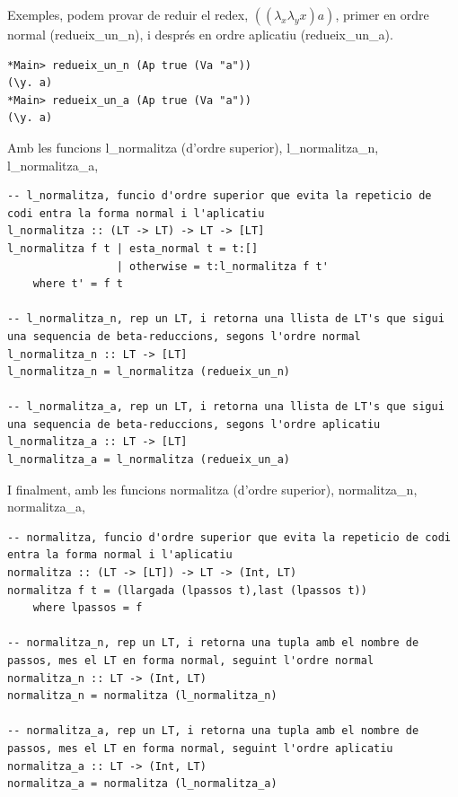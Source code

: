 \documentclass[10pt,a4paper]{article}
\begin{document}
Exemples, podem provar de reduir el redex, $((\lambda_x \lambda_y x) a)$, primer en ordre normal (redueix\_un\_n), i després en ordre aplicatiu (redueix\_un\_a).

\lstset{language=Haskell, breaklines=true, basicstyle=\footnotesize}
\begin{lstlisting}[frame=mystyle]
*Main> redueix_un_n (Ap true (Va "a"))
(\y. a)
*Main> redueix_un_a (Ap true (Va "a"))
(\y. a)
\end{lstlisting}

\clearpage

Amb les funcions l\_normalitza (d'ordre superior), l\_normalitza\_n, l\_normalitza\_a, 

\lstset{language=Haskell, breaklines=true, basicstyle=\footnotesize}
\begin{lstlisting}[frame=mystyle]
-- l_normalitza, funcio d'ordre superior que evita la repeticio de codi entra la forma normal i l'aplicatiu
l_normalitza :: (LT -> LT) -> LT -> [LT]
l_normalitza f t | esta_normal t = t:[]
                 | otherwise = t:l_normalitza f t'
    where t' = f t

-- l_normalitza_n, rep un LT, i retorna una llista de LT's que sigui una sequencia de beta-reduccions, segons l'ordre normal
l_normalitza_n :: LT -> [LT]
l_normalitza_n = l_normalitza (redueix_un_n)

-- l_normalitza_a, rep un LT, i retorna una llista de LT's que sigui una sequencia de beta-reduccions, segons l'ordre aplicatiu
l_normalitza_a :: LT -> [LT]
l_normalitza_a = l_normalitza (redueix_un_a)
\end{lstlisting}






I finalment, amb les funcions normalitza (d'ordre superior), normalitza\_n, normalitza\_a, 

\lstset{language=Haskell, breaklines=true, basicstyle=\footnotesize}
\begin{lstlisting}[frame=mystyle]
-- normalitza, funcio d'ordre superior que evita la repeticio de codi entra la forma normal i l'aplicatiu
normalitza :: (LT -> [LT]) -> LT -> (Int, LT)
normalitza f t = (llargada (lpassos t),last (lpassos t))
    where lpassos = f

-- normalitza_n, rep un LT, i retorna una tupla amb el nombre de passos, mes el LT en forma normal, seguint l'ordre normal
normalitza_n :: LT -> (Int, LT)
normalitza_n = normalitza (l_normalitza_n)

-- normalitza_a, rep un LT, i retorna una tupla amb el nombre de passos, mes el LT en forma normal, seguint l'ordre aplicatiu
normalitza_a :: LT -> (Int, LT)
normalitza_a = normalitza (l_normalitza_a)
\end{lstlisting}
\end{document}
